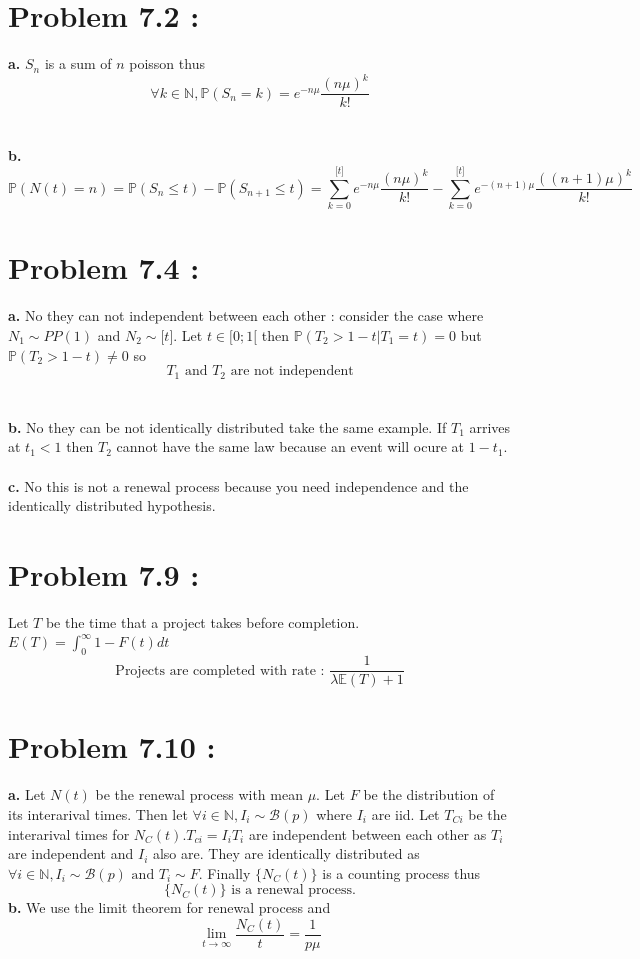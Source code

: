 \documentclass{article}
\begin{document}
\section*{Problem 7.2 :}
\textbf{a.} $S_n$ is a sum of $n$ poisson thus $$\boxed{\forall k\in \mathbb{N},\mathbb{P}(S_n=k) = e^{-n\mu}\dfrac{(n\mu)^k}{k!}}$$
\\\\
\textbf{b.} $$\boxed{\mathbb{P}(N(t)=n) = \mathbb{P}(S_n\leq t)-\mathbb{P}(S_{n+1}\leq t) = \sum_{k=0}^{\lbrack t\rbrack}e^{-n\mu}\dfrac{(n\mu)^k}{k!}-\sum_{k=0}^{\lbrack t \rbrack}e^{-(n+1)\mu}\dfrac{((n+1)\mu)^k}{k!}}$$
\section*{Problem 7.4 :}
\textbf{a.} No they can not independent between each other : consider the case where $N_1\sim PP(1)$ and $N_2\sim \lbrack t\rbrack$. Let $t\in[0;1[$ then $\mathbb{P}(T_2>1-t|T_1 = t) = 0$ but $\mathbb{P}(T_2>1-t)\neq 0$ so 
$$\boxed{\text{$T_1$ and $T_2$ are not independent}}$$
\\\\
\textbf{b.} No they can be not identically distributed take the same example. If $T_1$ arrives at $t_1<1$ then $T_2$ cannot have the same law because an event will ocure at $1-t_1$.
\\\\
\textbf{c.} No this is not a renewal process because you need independence and the identically distributed hypothesis.
\section*{Problem 7.9 :}
Let $T$ be the time that a project takes before completion. $E(T) = \int_0^{\infty}1-F(t)dt$
$$\boxed{\text{Projects are completed with rate : } \dfrac{1}{\lambda\mathbb{E}(T)+1}}$$
\section*{Problem 7.10 :}
\textbf{a.} Let $N(t)$ be the renewal process with mean $\mu$. Let $F$ be the distribution of its interarival times. Then let $\forall i\in\mathbb{N},I_i\sim\mathcal{B}(p)$ where $I_i$ are iid.
Let $T_{Ci}$ be the interarival times for $N_C(t)$.$T_{ci} = I_iT_i$ are independent between each other as $T_i$ are independent and $ I_i$ also are. They are identically distributed as $\forall i\in\mathbb{N}, I_i\sim \mathcal{B}(p)\text{ and }T_i\sim F$.
Finally $\{N_C(t)\}$ is a counting process thus $$\boxed{\{N_C(t)\} \text{ is a renewal process.}}$$
\textbf{b.}
We use the limit theorem for renewal process and $$\boxed{\lim_{t\to\infty}\dfrac{N_C(t)}{t} = \dfrac{1}{p\mu}}$$
\end{document}
